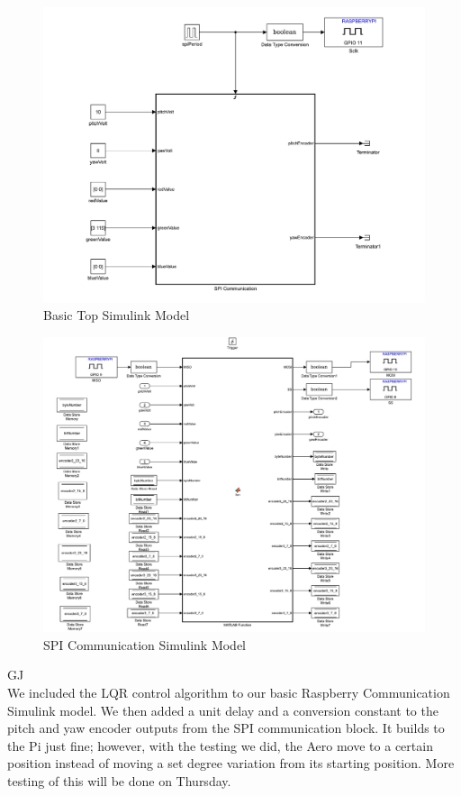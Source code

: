 \documentclass[fontsize=11pt, %
                             paper=letter, %
                             openany, %
                             captions=tableheading,
                             index=totoc,
                             hyperref]{labbook}
\begin{document}
\begin{addmargin}[0cm]{0cm}
\begin{figure}[H]
  \centering
  \includegraphics[width=1\textwidth]{figs/img/Basic_SPI_Communication}
  \caption{Basic Top Simulink Model}
  \label{fig:Basic_PI}
\end{figure}

\begin{figure}[H]
  \centering
  \includegraphics[width=1\textwidth]{figs/img/SPI_COM}
  \caption{SPI Communication Simulink Model}
  \label{fig:SPI_COM}
\end{figure}

GJ\\
We included the LQR control algorithm to our basic Raspberry Communication Simulink model.  We then added a unit delay and a conversion constant to the pitch and yaw encoder outputs from the SPI communication block.  It builds to the Pi just fine; however, with the testing we did, the Aero move to a certain position instead of moving a set degree variation from its starting position.  More testing of this will be done on Thursday.


\end{addmargin}
\end{document}
